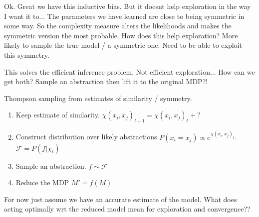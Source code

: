 Ok. Great we have this inductive bias. But it doesnt help exploration in the way I want it to...
The parameters we have learned are close to being symmetric in some way. So the complexity measure alters the likelihoods and makes the symmetric version the most probable.
How does this help exploration? More likely to sample the true model / a symmetric one. Need to be able to exploit this symmetry.

This solves the efficient inference problem. Not efficient exploration... How can we get both?
Sample an abstraction then lift it to the original MDP?!


Thompson sampling from estimates of similarity / symmetry.
\begin{enumerate}
	\tightlist
	\item Keep estimate of similarity. $\chi(x_i, x_j)_{t+1} = \chi(x_i, x_j)_t + ?$
	\item Construct distribution over likely abstractions $P(x_i = x_j) \propto e^{\chi(x_i, x_j)_t}$. $\mathcal F = P(f|\chi_t)$
	\item Sample an abstraction. $f\sim \mathcal F$
	\item Reduce the MDP $M' = f(M)$
\end{enumerate}


For now just assume we have an accurate estimate of the model.
What does acting optimally wrt the reduced model mean for exploration and convergence??


